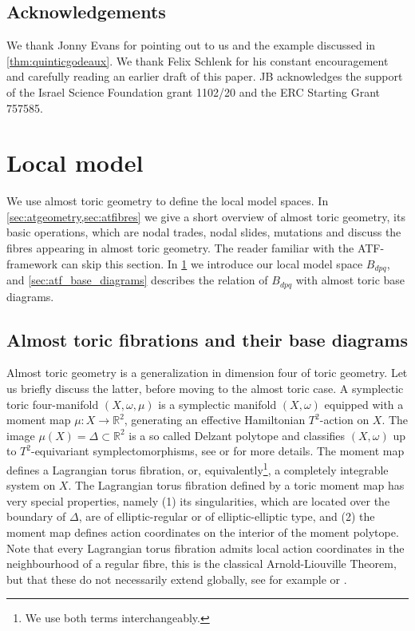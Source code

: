 \documentclass[12pt,a4paper,abstract=true,final]{scrartcl}
\begin{document}
\subsection{Acknowledgements}
We thank Jonny Evans for pointing out to us \cite{EvaUrz21} and the example discussed in \cref{thm:quinticgodeaux}.
We thank Felix Schlenk for his constant encouragement and carefully reading an earlier draft of this paper.
JB acknowledges the support of the Israel Science Foundation grant 1102/20 and the ERC Starting Grant 757585.

\section{Local model}
\label{sec:local_model}

We use almost toric geometry to define the local model spaces.
In \cref{sec:atgeometry,sec:atfibres} we give a short overview of almost toric geometry, its basic operations, which are nodal trades, nodal slides, mutations and discuss the fibres appearing in almost toric geometry.
The reader familiar with the ATF-framework can skip this section.
In \cref{sec:local_model} we introduce our local model space $B_{dpq}$, and \cref{sec:atf_base_diagrams} describes the relation of $B_{dpq}$ with almost toric base diagrams.

\subsection{Almost toric fibrations and their base diagrams}
\label{sec:atgeometry}

Almost toric geometry is a generalization in dimension four of toric geometry.
Let us briefly discuss the latter, before moving to the almost toric case.
A symplectic toric four-manifold $(X,\omega,\mu)$ is a symplectic manifold $(X,\omega)$ equipped with a moment map $\mu \colon X \rightarrow \mathbb{R}^2$, generating an effective Hamiltonian $T^2$-action on $X$.
The image $\mu(X) = \Delta \subset \mathbb{R}^2$ is a so called Delzant polytope and classifies $(X,\omega)$ up to $T^2$-equivariant symplectomorphisms, see \cite{Del88} or \cite{Can03} for more details.
The moment map defines a Lagrangian torus fibration, or, equivalently\footnote{We use both terms interchangeably.}, a completely integrable system on $X$.
The Lagrangian torus fibration defined by a toric moment map has very special properties, namely (1) its singularities, which are located over the boundary of $\Delta$, are of elliptic-regular or of elliptic-elliptic type, and (2) the moment map defines action coordinates on the interior of the moment polytope.
Note that every Lagrangian torus fibration admits local action coordinates in the neighbourhood of a regular fibre, this is the classical Arnold-Liouville Theorem, but that these do not necessarily extend globally, see for example \cite{Dui80} or \cite{Zun96,Zun03}.
\end{document}
